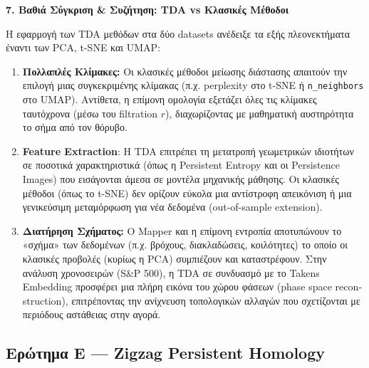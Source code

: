 \documentclass[12pt]{article}
\newcommand{\en}[1]{\foreignlanguage{english}{#1}}
\begin{document}
\textbf{7. Βαθιά Σύγκριση \& Συζήτηση: \en{TDA} \en{vs} Κλασικές Μέθοδοι}
\vspace{0.5em}

Η εφαρμογή των \foreignlanguage{english}{TDA} μεθόδων στα δύο \foreignlanguage{english}{datasets} ανέδειξε τα εξής πλεονεκτήματα έναντι των \foreignlanguage{english}{PCA}, \foreignlanguage{english}{t-SNE} και \foreignlanguage{english}{UMAP}:
\begin{enumerate}
    \item \textbf{Πολλαπλές Κλίμακες:} Οι κλασικές μέθοδοι μείωσης διάστασης απαιτούν την επιλογή μιας συγκεκριμένης κλίμακας (π.χ. \foreignlanguage{english}{perplexity} στο \foreignlanguage{english}{t-SNE} ή \foreignlanguage{english}{\texttt{n\_neighbors}} στο \foreignlanguage{english}{UMAP}). Αντίθετα, η επίμονη ομολογία εξετάζει όλες τις κλίμακες ταυτόχρονα (μέσω του \en{filtration} $r$), διαχωρίζοντας με μαθηματική αυστηρότητα το σήμα από τον θόρυβο.
    \item \foreignlanguage{english}{\textbf{Feature Extraction}}: Η \foreignlanguage{english}{TDA} επιτρέπει τη μετατροπή γεωμετρικών ιδιοτήτων σε ποσοτικά χαρακτηριστικά (όπως η \foreignlanguage{english}{Persistent Entropy} και οι \foreignlanguage{english}{Persistence Images}) που εισάγονται άμεσα σε μοντέλα μηχανικής μάθησης. Οι κλασικές μέθοδοι (όπως το \foreignlanguage{english}{t-SNE}) δεν ορίζουν εύκολα μια αντίστροφη απεικόνιση ή μια γενικεύσιμη μεταμόρφωση για νέα δεδομένα (\foreignlanguage{english}{out-of-sample extension}).
    \item \textbf{Διατήρηση Σχήματος:} Ο \foreignlanguage{english}{Mapper} και η επίμονη εντροπία αποτυπώνουν το «σχήμα» των δεδομένων (π.χ. βρόχους, διακλαδώσεις, κοιλότητες) το οποίο οι κλασικές προβολές (κυρίως η \foreignlanguage{english}{PCA}) συμπιέζουν και καταστρέφουν. Στην ανάλυση χρονοσειρών (\foreignlanguage{english}{S\&P 500}), η \foreignlanguage{english}{TDA} σε συνδυασμό με το \foreignlanguage{english}{Takens Embedding} προσφέρει μια πλήρη εικόνα του χώρου φάσεων (\foreignlanguage{english}{phase space reconstruction}), επιτρέποντας την ανίχνευση τοπολογικών αλλαγών που σχετίζονται με περιόδους αστάθειας στην αγορά.
\end{enumerate}

\newpage
\subsection{Ερώτημα Ε --- \en{Zigzag Persistent Homology}}
\vspace{1em}
\end{document}
